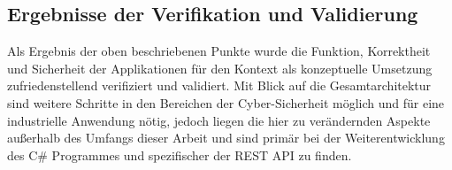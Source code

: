 \subsection*{Ergebnisse der Verifikation und Validierung}
\label{subsec:ergebnisse}

Als Ergebnis der oben beschriebenen Punkte wurde die Funktion, Korrektheit und Sicherheit der Applikationen für den Kontext als konzeptuelle Umsetzung zufriedenstellend verifiziert und validiert. Mit Blick auf die Gesamtarchitektur sind weitere Schritte in den Bereichen der Cyber-Sicherheit möglich und für eine industrielle Anwendung nötig, jedoch liegen die hier zu verändernden Aspekte außerhalb des Umfangs dieser Arbeit und sind primär bei der Weiterentwicklung des C\# Programmes und spezifischer der REST API zu finden.